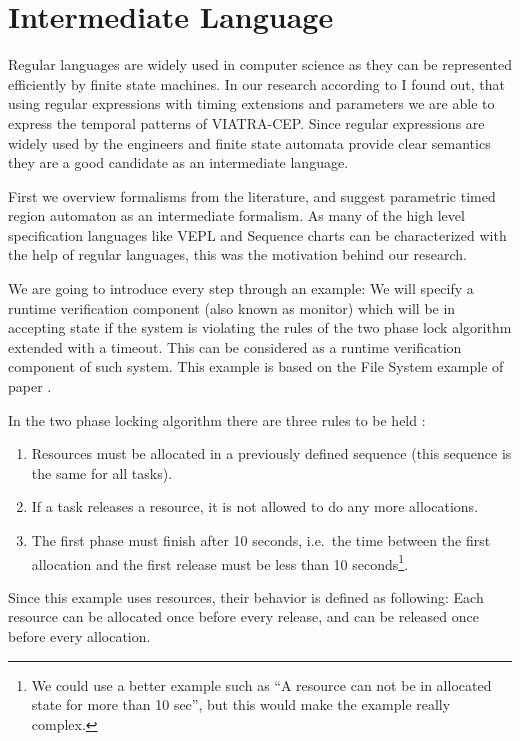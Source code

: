 	\chapter{Intermediate Language}
	\label{chap:cep}
	
	
	Regular languages are widely used in computer science as they can be represented efficiently by finite state machines.		
	In our research according to \citep{davidi} I found out, that using regular expressions with timing extensions and parameters we are able to express the temporal patterns of VIATRA-CEP.
	Since regular expressions are widely used by the engineers and finite state automata provide clear semantics they are a good candidate as an intermediate language.
	
	First we overview formalisms from the literature, and suggest parametric timed region automaton as an intermediate formalism.
	As many of the high level specification languages like VEPL and Sequence charts can be characterized with the help of regular languages,
	this was the motivation behind our research.%
	
	We are going to introduce every step through an example: 
	We will specify a runtime verification component (also known as monitor) which will be in accepting state if the system is violating the rules of the two phase lock algorithm extended with a timeout.
	This can be considered as a runtime verification component of such system. This example is based on the File System example of paper \citep{marq}.
	
	In the two phase locking algorithm there are three rules to be held :
	\begin{enumerate}
		\item Resources must be allocated in a previously defined sequence (this sequence is the same for all tasks).
		\item If a task releases a resource, it is not allowed to do any more allocations.
		\item The first phase must finish after 10 seconds, i.e.~the time between the first allocation and the first release must be less than 10 seconds\footnote{We could use a better example such as ``A resource can not be in allocated state for more than 10 sec'', but this would make the example really complex.}. 
	\end{enumerate}
	
	Since this example uses resources, their behavior is defined as following:
	Each resource can be allocated once before every release, and can be released once before every allocation.
		
